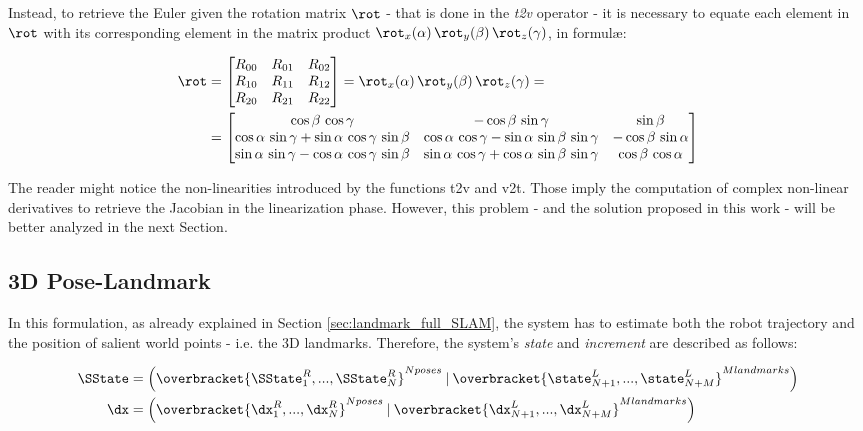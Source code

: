 Instead, to retrieve the Euler given the rotation matrix $\rot$ - that is done in the \textit{t2v} operator - it is necessary to equate each element in $\rot$ with its corresponding element in the matrix product $\rot_x(\alpha) \, \rot_y(\beta)\, \rot_z(\gamma)$, in formul\ae:

\begin{align}
    \label{eq:rot_composition_xyz}
    \rot &= 
        \begin{bmatrix}
            R_{00} & R_{01} & R_{02} \\
            R_{10} & R_{11} & R_{12} \\
            R_{20} & R_{21} & R_{22} 
        \end{bmatrix}
     = \rot_x(\alpha) \, \rot_y(\beta)\, \rot_z(\gamma) = \\
     &=
        \begin{bmatrix}
            \cos\beta\,\cos\gamma & -\cos\beta\,\sin\gamma & \sin\beta \\
            \cos\alpha\,\sin\gamma + \sin\alpha\,\cos\gamma\,\sin\beta & \cos\alpha\,\cos\gamma - \sin\alpha\,\sin\beta\,\sin\gamma & -\cos\beta\,\sin\alpha \\
            \sin\alpha\,\sin\gamma - \cos\alpha\,\cos\gamma\,\sin\beta & \sin\alpha\,\cos\gamma + \cos\alpha\,\sin\beta\,\sin\gamma & \cos\beta\,\cos\alpha 
        \end{bmatrix} \nonumber
\end{align}

The reader might notice the non-linearities introduced by the functions t2v and v2t. Those imply the computation of complex non-linear derivatives to retrieve the Jacobian in the linearization phase. However, this problem - and the solution proposed in this work - will be better analyzed in the next Section.

\subsection{3D Pose-Landmark}\label{subsec:3d_pose_landmark}
In this formulation, as already explained in Section \ref{sec:landmark_full_SLAM}, the system has to estimate both the robot trajectory and the position of salient world points - i.e. the 3D landmarks. Therefore, the system's \textit{state} and \textit{increment} are described as follows:

\begin{align*}
    \SState &= \left(\overbracket{\SState^R_1, ..., \SState^R_N}^{N poses}\: |\: \overbracket{\state^L_{N+1}, ..., \state^L_{N+M}}^{M landmarks}\right) \\
    \dx &= \left(\overbracket{\dx^R_1, ..., \dx^R_N}^{N poses}\: |\: \overbracket{\dx^L_{N+1}, ..., \dx^L_{N+M}}^{M landmarks}\right)
\end{align*}

